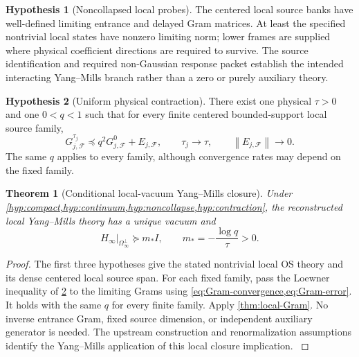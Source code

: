 \documentclass[11pt,oneside,openany]{book}
\newtheorem{theorem}{Theorem}[chapter]
\theoremstyle{definition}
\newtheorem{hypothesis}[hypothesis]{Hypothesis}
\theoremstyle{remark}
\newcommand{\norm}[1]{\left\lVert#1\right\rVert}
\newcommand{\src}[2]{\cite[#2]{#1}}
\begin{document}
\begin{hypothesis}[Noncollapsed local probes]\label{hyp:noncollapse}
The centered local source banks have well-defined limiting entrance and delayed Gram matrices. At least the specified nontrivial local states have nonzero limiting norm; lower frames are supplied where physical coefficient directions are required to survive. The source identification and required non-Gaussian response packet establish the intended interacting Yang--Mills branch rather than a zero or purely auxiliary theory.
\end{hypothesis}

\begin{hypothesis}[Uniform physical contraction]\label{hyp:contraction}
There exist one physical $\tau>0$ and one $0<q<1$ such that for every finite centered bounded-support local source family,
\[
G_{j,\mathcal F}^{\tau_j}\preceq q^2G_{j,\mathcal F}^0+E_{j,\mathcal F},
\qquad \tau_j\to\tau,\qquad \norm{E_{j,\mathcal F}}\to0.
\]
The same $q$ applies to every family, although convergence rates may depend on the fixed family.
\end{hypothesis}

\begin{theorem}[Conditional local-vacuum Yang--Mills closure]\label{thm:master}
Under \cref{hyp:compact,hyp:continuum,hyp:noncollapse,hyp:contraction}, the reconstructed local Yang--Mills theory has a unique vacuum and
\begin{equation}\label{eq:master-gap}
\boxed{\displaystyle
H_\infty|_{\Omega_\infty^\perp}\succeq m_*I,
\qquad m_*=-\frac{\log q}{\tau}>0.}
\end{equation}
\end{theorem}
\begin{proof}
The first three hypotheses give the stated nontrivial local OS theory and its dense centered local source span. For each fixed family, pass the Loewner inequality of \cref{hyp:contraction} to the limiting Grams using \cref{eq:Gram-convergence,eq:Gram-error}. It holds with the same $q$ for every finite family. Apply \cref{thm:local-Gram}. No inverse entrance Gram, fixed source dimension, or independent auxiliary generator is needed. The upstream construction and renormalization assumptions identify the Yang--Mills application of this local closure implication. \src{F1}{V1}
\end{proof}
\end{document}
